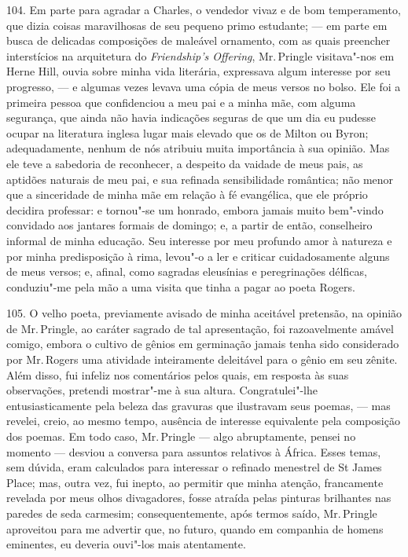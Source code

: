104. Em parte para agradar a Charles, o vendedor vivaz e de bom
temperamento, que dizia coisas maravilhosas de seu pequeno primo
estudante; --- em parte em busca de delicadas composições de maleável
ornamento, com as quais preencher interstícios na arquitetura do
\emph{Friendship's Offering}, Mr.\,Pringle visitava"-nos em Herne Hill,
ouvia sobre minha vida literária, expressava algum interesse por seu
progresso, --- e algumas vezes levava uma cópia de meus versos no bolso.
Ele foi a primeira pessoa que confidenciou a meu pai e a minha mãe, com
alguma segurança, que ainda não havia indicações seguras de que um dia
eu pudesse ocupar na literatura inglesa lugar mais elevado que os de
Milton ou Byron; adequadamente, nenhum de nós atribuiu muita
importância à sua opinião. Mas ele teve a sabedoria de reconhecer, a
despeito da vaidade de meus pais, as aptidões naturais de meu pai, e sua
refinada sensibilidade romântica; não menor que a sinceridade de minha
mãe em relação à fé evangélica, que ele próprio decidira professar: e
tornou"-se um honrado, embora jamais muito bem"-vindo convidado aos
jantares formais de domingo; e, a partir de então, conselheiro informal
de minha educação. Seu interesse por meu profundo amor à natureza e por
minha predisposição à rima, levou"-o a ler e criticar cuidadosamente
alguns de meus versos; e, afinal, como sagradas eleusínias e
peregrinações délficas, conduziu"-me pela mão a uma visita que tinha a
pagar ao poeta Rogers.

105. O velho poeta, previamente avisado de minha aceitável pretensão, na
opinião de Mr.\,Pringle, ao caráter sagrado de tal apresentação, foi
razoavelmente amável comigo, embora o cultivo de gênios em germinação
jamais tenha sido considerado por Mr.\,Rogers uma atividade inteiramente
deleitável para o gênio em seu zênite. Além disso, fui infeliz nos
comentários pelos quais, em resposta às suas observações, pretendi
mostrar"-me à sua altura. Congratulei"-lhe entusiasticamente pela beleza
das gravuras que ilustravam seus poemas, --- mas revelei, creio, ao mesmo
tempo, ausência de interesse equivalente pela composição dos poemas. Em
todo caso, Mr.\,Pringle --- algo abruptamente, pensei no momento --- desviou
a conversa para assuntos relativos à África. Esses temas, sem dúvida,
eram calculados para interessar o refinado menestrel de St James Place;
mas, outra vez, fui inepto, ao permitir que minha atenção, francamente
revelada por meus olhos divagadores, fosse atraída pelas pinturas
brilhantes nas paredes de seda carmesim; consequentemente, após termos
saído, Mr.\,Pringle aproveitou para me advertir que, no futuro, quando em
companhia de homens eminentes, eu deveria ouvi"-los mais atentamente.


